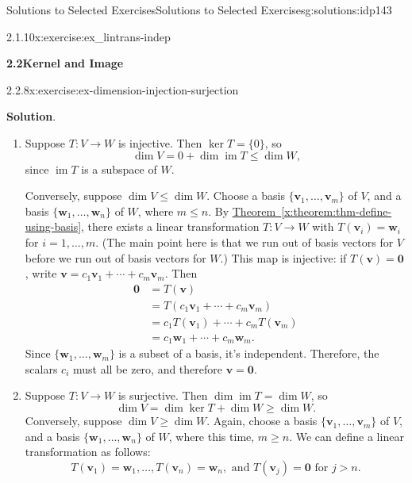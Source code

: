 \documentclass[oneside,10pt,]{book}
\newcommand{\blocktitlefont}{\relax}
\newcommand{\xreffont}{\relax}
\numberwithin{equation}{section}
\newcommand{\im}{\operatorname{im}}
\newcommand{\vv}{\mathbf{v}}
\newcommand{\ww}{\mathbf{w}}
\newcommand{\amp}{&}
\begin{document}
\begin{solutions-chapter}{Solutions to Selected Exercises}{}{Solutions to Selected Exercises}{}{}{g:solutions:idp143}
\begin{inlinesolution}{2.1.10}{}{x:exercise:ex_lintrans-indep}
\end{inlinesolution}%
\par\medskip
\noindent\textbf{\Large{}2.2\space\textperiodcentered\space{}Kernel and Image}
\begin{inlinesolution}{2.2.8}{}{x:exercise:ex-dimension-injection-surjection}%
\par\smallskip%
\noindent\textbf{\blocktitlefont Solution}.\hypertarget{g:solution:idp161-back}{}\quad{}%
\begin{enumerate}
\item{}Suppose \(T:V\to W\) is injective. Then \(\ker T = \{0\}\), so%
\begin{equation*}
\dim V = 0 + \dim \im T \leq \dim W\text{,}
\end{equation*}
since \(\im T\) is a subspace of \(W\).%
\par
Conversely, suppose \(\dim V\leq \dim W\). Choose a basis \(\{\vv_1,\ldots, \vv_m\}\) of \(V\), and a basis \(\{\ww_1,\ldots, \ww_n\}\) of \(W\), where \(m\leq n\). By \hyperref[x:theorem:thm-define-using-basis]{Theorem~{\xreffont\ref{x:theorem:thm-define-using-basis}}}, there exists a linear transformation \(T:V\to W\) with \(T(\vv_i)=\ww_i\) for \(i=1,\ldots, m\). (The main point here is that we run out of basis vectors for \(V\) before we run out of basis vectors for \(W\).) This map is injective: if \(T(\vv)=\mathbf{0}\), write \(\vv=c_1\vv_1+\cdots + c_m\vv_m\). Then%
\begin{align*}
\mathbf{0} \amp = T(\vv)\\
\amp = T(c_1\vv_1+\cdots + c_m\vv_m)\\
\amp = c_1T(\vv_1)+\cdots + c_mT(\vv_m)\\
\amp = c_1\ww_1+\cdots +c_m\ww_m\text{.}
\end{align*}
Since \(\{\ww_1,\ldots, \ww_m\}\) is a subset of a basis, it's independent. Therefore, the scalars \(c_i\) must all be zero, and therefore \(\vv=\mathbf{0}\).%
\item{}Suppose \(T:V\to W\) is surjective. Then \(\dim \im T = \dim W\), so%
\begin{equation*}
\dim V = \dim \ker T + \dim W \geq  \dim W\text{.}
\end{equation*}
Conversely, suppose \(\dim V\geq \dim W\). Again, choose a basis \(\{\vv_1,\ldots, \vv_m\}\) of \(V\), and a basis \(\{\ww_1,\ldots, \ww_n\}\) of \(W\), where this time, \(m\geq n\). We can define a linear transformation as follows:%
\begin{equation*}
T(\vv_1)=\ww_1,\ldots, T(\vv_n)=\ww_n, \text{ and } T(\vv_j) = \mathbf{0} \text{ for } j>n.

\end{equation*}
\end{enumerate}
\end{inlinesolution}
\end{solutions-chapter}
\end{document}

